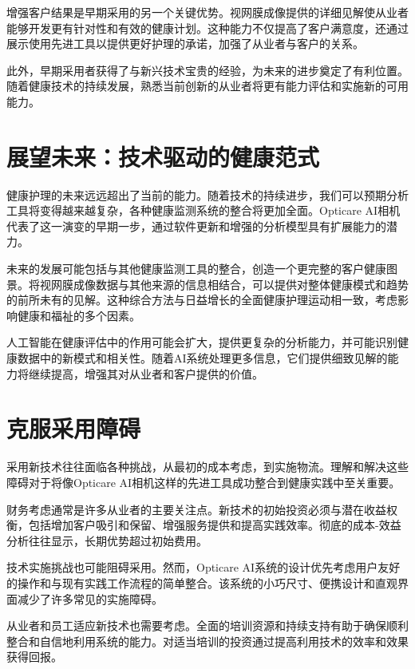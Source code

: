 \documentclass[
  Letterpaper,
]{scrbook}
\begin{document}
增强客户结果是早期采用的另一个关键优势。视网膜成像提供的详细见解使从业者能够开发更有针对性和有效的健康计划。这种能力不仅提高了客户满意度，还通过展示使用先进工具以提供更好护理的承诺，加强了从业者与客户的关系。

此外，早期采用者获得了与新兴技术宝贵的经验，为未来的进步奠定了有利位置。随着健康技术的持续发展，熟悉当前创新的从业者将更有能力评估和实施新的可用能力。

\section{展望未来：技术驱动的健康范式}\label{ux5c55ux671bux672aux6765ux6280ux672fux9a71ux52a8ux7684ux5065ux5eb7ux8303ux5f0f}

健康护理的未来远远超出了当前的能力。随着技术的持续进步，我们可以预期分析工具将变得越来越复杂，各种健康监测系统的整合将更加全面。Opticare
AI相机代表了这一演变的早期一步，通过软件更新和增强的分析模型具有扩展能力的潜力。

未来的发展可能包括与其他健康监测工具的整合，创造一个更完整的客户健康图景。将视网膜成像数据与其他来源的信息相结合，可以提供对整体健康模式和趋势的前所未有的见解。这种综合方法与日益增长的全面健康护理运动相一致，考虑影响健康和福祉的多个因素。

人工智能在健康评估中的作用可能会扩大，提供更复杂的分析能力，并可能识别健康数据中的新模式和相关性。随着AI系统处理更多信息，它们提供细致见解的能力将继续提高，增强其对从业者和客户提供的价值。

\section{克服采用障碍}\label{ux514bux670dux91c7ux7528ux969cux788d}

采用新技术往往面临各种挑战，从最初的成本考虑，到实施物流。理解和解决这些障碍对于将像Opticare
AI相机这样的先进工具成功整合到健康实践中至关重要。

财务考虑通常是许多从业者的主要关注点。新技术的初始投资必须与潜在收益权衡，包括增加客户吸引和保留、增强服务提供和提高实践效率。彻底的成本-效益分析往往显示，长期优势超过初始费用。

技术实施挑战也可能阻碍采用。然而，Opticare
AI系统的设计优先考虑用户友好的操作和与现有实践工作流程的简单整合。该系统的小巧尺寸、便携设计和直观界面减少了许多常见的实施障碍。

从业者和员工适应新技术也需要考虑。全面的培训资源和持续支持有助于确保顺利整合和自信地利用系统的能力。对适当培训的投资通过提高利用技术的效率和效果获得回报。
\end{document}
